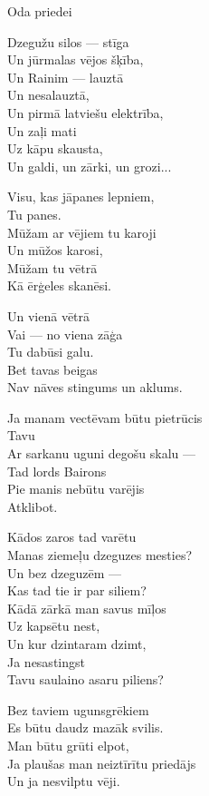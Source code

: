 \documentclass[14pt]{extarticle}
\begin{document}
\newpage

{\large \sc Oda priedei}

Dzegužu silos --- stīga\\
Un jūrmalas vējos šķība,\\
Un Rainim --- lauztā\\
Un nesalauztā,\\
Un pirmā latviešu elektrība,\\
Un zaļi mati\\
Uz kāpu skausta,\\
Un galdi, un zārki, un grozi...

Visu, kas jāpanes lepniem,\\
Tu panes.\\
Mūžam ar vējiem tu karoji\\
Un mūžos karosi,\\
Mūžam tu vētrā\\
Kā ērģeles skanēsi.

Un vienā vētrā\\
Vai --- no viena zāģa\\
Tu dabūsi galu.\\
Bet tavas beigas\\
Nav nāves stingums un aklums.

Ja manam vectēvam būtu pietrūcis\\
Tavu\\
Ar sarkanu uguni degošu skalu ---\\
Tad lords Bairons\\
Pie manis nebūtu varējis\\
Atklibot.

Kādos zaros tad varētu\\
Manas ziemeļu dzeguzes mesties?\\
Un bez dzeguzēm ---\\
Kas tad tie ir par siliem?\\
Kādā zārkā man savus mīļos\\
Uz kapsētu nest,\\
Un kur dzintaram dzimt,\\
Ja nesastingst\\
Tavu saulaino asaru piliens?

Bez taviem ugunsgrēkiem\\
Es būtu daudz mazāk svilis.\\
Man būtu grūti elpot,\\
Ja plaušas man neiztīrītu priedājs\\
Un ja nesvilptu vēji.
\end{document}
